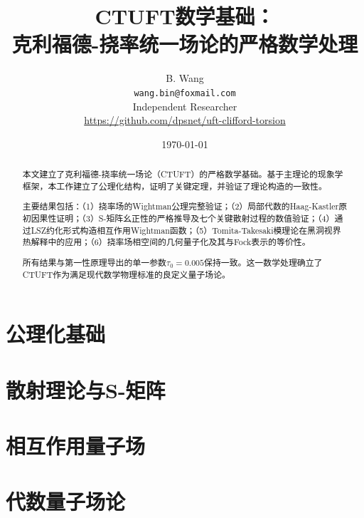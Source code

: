 \documentclass[12pt,a4paper]{article}
\title{\textbf{CTUFT数学基础：} \\ 克利福德-挠率统一场论的严格数学处理}
\author{B. Wang \\
\small\texttt{wang.bin@foxmail.com} \\
\small Independent Researcher \\
\small\url{https://github.com/dpsnet/uft-clifford-torsion}}
\date{\today}
\theoremstyle{definition}
\theoremstyle{remark}
\begin{document}
\maketitle

\begin{abstract}
\noindent
本文建立了克利福德-挠率统一场论（CTUFT）的严格数学基础。基于主理论的现象学框架，本工作建立了公理化结构，证明了关键定理，并验证了理论构造的一致性。

主要结果包括：（1）挠率场的Wightman公理完整验证；（2）局部代数的Haag-Kastler原初因果性证明；（3）S-矩阵幺正性的严格推导及七个关键散射过程的数值验证；（4）通过LSZ约化形式构造相互作用Wightman函数；（5）Tomita-Takesaki模理论在黑洞视界热解释中的应用；（6）挠率场相空间的几何量子化及其与Fock表示的等价性。

所有结果与第一性原理导出的单一参数$\tau_0 = 0.005$保持一致。这一数学处理确立了CTUFT作为满足现代数学物理标准的良定义量子场论。
\end{abstract}

\tableofcontents
\newpage

\part{公理化基础}






\part{散射理论与S-矩阵}





\part{相互作用量子场}





\part{代数量子场论}
\end{document}
